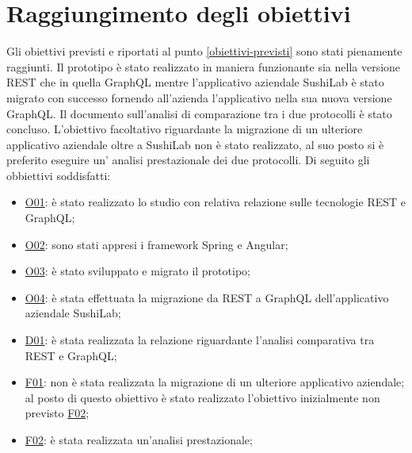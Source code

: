 \section{Raggiungimento degli obiettivi}
Gli obiettivi previsti e riportati al punto \ref{obiettivi-previsti} sono stati pienamente raggiunti. Il prototipo è stato realizzato in maniera funzionante sia nella versione REST che in quella GraphQL mentre l'applicativo aziendale SushiLab è stato migrato con successo fornendo all'azienda l'applicativo nella sua nuova versione GraphQL. Il documento sull'analisi di comparazione tra i due protocolli è stato concluso. L'obiettivo facoltativo riguardante la migrazione di un ulteriore applicativo aziendale oltre a SushiLab non è stato realizzato, al suo posto si è preferito eseguire un' analisi prestazionale dei due protocolli.
Di seguito gli obbiettivi soddisfatti:
\begin{itemize}
  \item \underline{O01}: è stato realizzato lo studio con relativa relazione sulle tecnologie REST e GraphQL;
  \item \underline{O02}: sono stati appresi i framework Spring e Angular;
  \item \underline{O03}: è stato sviluppato e migrato il prototipo;
  \item \underline{O04}: è stata effettuata la migrazione da REST a GraphQL dell'applicativo aziendale SushiLab;
  \item \underline{D01}: è stata realizzata la relazione riguardante l'analisi comparativa tra REST e GraphQL;
  \item \underline{F01}: non è stata realizzata la migrazione di un ulteriore applicativo aziendale; al posto di questo obiettivo è stato realizzato l'obiettivo inizialmente non previsto \underline{F02};
  \item \underline{F02}: è stata realizzata un'analisi prestazionale;
\end{itemize}
